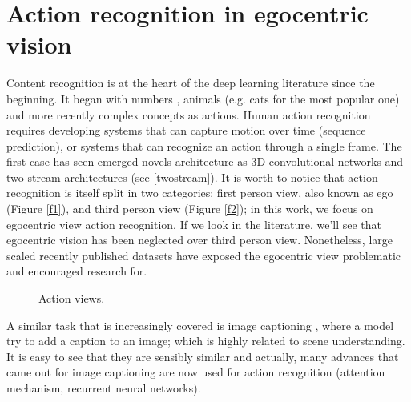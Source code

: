 \documentclass[12pt, a4paper]{report}
\begin{document}
	\chapter{Action recognition in egocentric vision}\label{ar}
		Content recognition is at the heart of the deep learning literature since the beginning. It began with numbers \cite{lecun_98}, animals (e.g. cats for the most popular one) and more recently complex concepts as actions.
		Human action recognition requires developing systems that can capture motion over time (sequence prediction), or systems that can recognize an action through a single frame.
		The first case has seen emerged novels architecture as 3D convolutional networks \cite{ji} and two-stream architectures (see \ref{twostream}).
		It is worth to notice that action recognition is itself split in two categories: first person view, also known as \gls{ego} (Figure \ref{f1}), and third person view (Figure \ref{f2}); in this work, we focus on egocentric view action recognition.
		If we look in the literature, we'll see that egocentric vision has been neglected over third person view.
		Nonetheless, large scaled recently published datasets have exposed the egocentric view problematic and encouraged research for.\\
		\begin{figure}[!tbp]
			\centering
			\hfill
			\caption{Action views.}
		\end{figure}
		
		A similar task that is increasingly covered is image captioning \cite{xu}, where a model try to add a caption to an image; which is highly related to scene understanding.
		It is easy to see that they are sensibly similar and actually, many advances that came out for image captioning are now used for action recognition (attention mechanism, recurrent neural networks).
\end{document}
